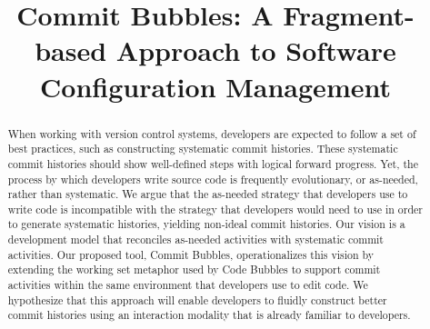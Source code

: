 \documentclass[conference]{IEEEtran}
\begin{document}
%

\title{Commit Bubbles: A Fragment-based Approach to Software Configuration Management}



\author{
}


\maketitle

\begin{abstract}
When working with version control systems, developers are expected to follow a set of best practices, 
such as constructing systematic commit histories. 
These systematic commit histories should show well-defined steps with logical forward progress. 
Yet, the process by which developers write source code is frequently evolutionary, or as-needed, rather than systematic. 
We argue that the as-needed strategy that developers use to write code is incompatible with the strategy
that developers would need to use in order to generate systematic histories, yielding non-ideal commit histories. 
Our vision is a development model that reconciles as-needed activities with systematic commit activities. 
Our proposed tool, Commit Bubbles, operationalizes this vision by extending the working set metaphor used by 
Code Bubbles to support commit activities within the same environment that developers use to edit code. 
We hypothesize that this approach will enable developers to fluidly construct better commit histories using 
an interaction modality that is already familiar to developers.
\end{abstract}


%
\IEEEpeerreviewmaketitle
\end{document}
